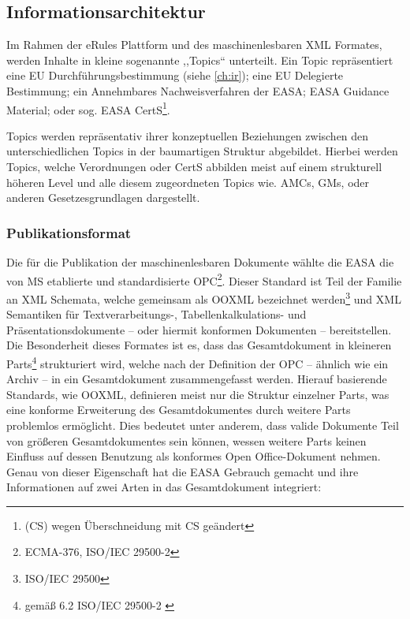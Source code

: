 \subsection{Informationsarchitektur}
\label{ch:easa_arch}

    Im Rahmen der eRules Plattform und des maschinenlesbaren \ac{XML} Formates, werden Inhalte in kleine sogenannte ,,Topics`` unterteilt.
    Ein Topic repräsentiert eine \ac{EU} Durchführungsbestimmung (siehe \ref{ch:ir}); eine \ac{EU} Delegierte Bestimmung; ein Annehmbares Nachweisverfahren der \ac{EASA}; \ac{EASA} Guidance Material; oder sog. \ac{EASA} \acf{CertS}\footnote{(CS) wegen Überschneidung mit \acf{CS} geändert}. \cite[S. 5f]{easa_xml_doc}
    
    Topics werden repräsentativ ihrer konzeptuellen Beziehungen zwischen den unterschiedlichen Topics in der baumartigen Struktur abgebildet.
    Hierbei werden Topics, welche Verordnungen oder \ac{CertS} abbilden meist auf einem strukturell höheren Level und alle diesem zugeordneten Topics wie. \acsp{AMC}, \acsp{GM}, oder anderen Gesetzesgrundlagen dargestellt.
    
        
\subsubsection{Publikationsformat}

    Die für die Publikation der maschinenlesbaren Dokumente wählte die \ac{EASA} die von \acf{MS} etablierte und standardisierte \acf{OPC}\footnote{\acs{ECMA}-376, ISO/IEC 29500-2}.
    Dieser Standard ist Teil der Familie an \ac{XML} Schemata, welche gemeinsam als \acf{OOXML} bezeichnet werden\footnote{ ISO/IEC 29500} und \ac{XML} Semantiken für Textverarbeitungs-, Tabellen\-kal\-ku\-lations- und Präsentationsdokumente -- oder hiermit konformen Dokumenten -- bereitstellen. 
    \cite[vii]{easa_opc_iso} 
    Die Besonderheit dieses Formates ist es, dass das Gesamtdokument in kleineren Parts\footnote{gemäß 6.2 ISO/IEC 29500-2 \cite{easa_opc_iso}} strukturiert wird, welche nach der Definition der \ac{OPC} -- ähnlich wie ein Archiv -- in ein Gesamtdokument zusammengefasst werden.
    Hierauf basierende Standards, wie \ac{OOXML}, definieren meist nur die Struktur einzelner Parts, was eine konforme Erweiterung des Gesamtdokumentes durch weitere Parts problemlos ermöglicht.   
    Dies bedeutet unter anderem, dass valide Dokumente Teil von größeren Gesamtdokumentes sein können, wessen weitere Parts keinen Einfluss auf dessen Benutzung als konformes Open Office-Dokument nehmen.
    Genau von dieser Eigenschaft hat die \ac{EASA} Gebrauch gemacht und ihre Informationen auf zwei Arten in das Gesamtdokument integriert:

